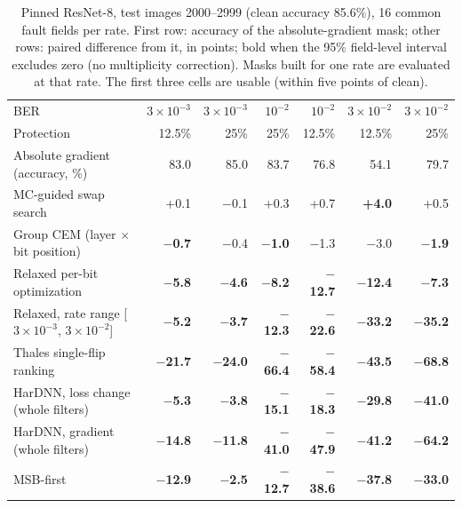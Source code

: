 \begin{table}[h]
\caption{Pinned ResNet-8, test images 2000--2999 (clean accuracy 85.6\%), 16 common fault fields per rate. First row: accuracy of the absolute-gradient mask; other rows: paired difference from it, in points; bold when the 95\% field-level interval excludes zero (no multiplicity correction). Masks built for one rate are evaluated at that rate. The first three cells are usable (within five points of clean).}\label{tab:search}
\centering\footnotesize\setlength{\tabcolsep}{4pt}
\begin{tabular}{l r r r r r r}\toprule
BER & $3\!\times\!10^{-3}$ & $3\!\times\!10^{-3}$ & $10^{-2}$ & $10^{-2}$ & $3\!\times\!10^{-2}$ & $3\!\times\!10^{-2}$\\
Protection & 12.5\% & 25\% & 25\% & 12.5\% & 12.5\% & 25\%\\\midrule
Absolute gradient (accuracy, \%) & 83.0 & 85.0 & 83.7 & 76.8 & 54.1 & 79.7\\
MC-guided swap search & +0.1 & $-$0.1 & +0.3 & +0.7 & \textbf{+4.0} & +0.5\\
Group CEM (layer $\times$ bit position) & \textbf{$-$0.7} & $-$0.4 & \textbf{$-$1.0} & $-$1.3 & $-$3.0 & \textbf{$-$1.9}\\
Relaxed per-bit optimization & \textbf{$-$5.8} & \textbf{$-$4.6} & \textbf{$-$8.2} & \textbf{$-$12.7} & \textbf{$-$12.4} & \textbf{$-$7.3}\\
Relaxed, rate range [$3\!\times\!10^{-3}$, $3\!\times\!10^{-2}$] & \textbf{$-$5.2} & \textbf{$-$3.7} & \textbf{$-$12.3} & \textbf{$-$22.6} & \textbf{$-$33.2} & \textbf{$-$35.2}\\
Thales single-flip ranking & \textbf{$-$21.7} & \textbf{$-$24.0} & \textbf{$-$66.4} & \textbf{$-$58.4} & \textbf{$-$43.5} & \textbf{$-$68.8}\\
HarDNN, loss change (whole filters) & \textbf{$-$5.3} & \textbf{$-$3.8} & \textbf{$-$15.1} & \textbf{$-$18.3} & \textbf{$-$29.8} & \textbf{$-$41.0}\\
HarDNN, gradient (whole filters) & \textbf{$-$14.8} & \textbf{$-$11.8} & \textbf{$-$41.0} & \textbf{$-$47.9} & \textbf{$-$41.2} & \textbf{$-$64.2}\\
MSB-first & \textbf{$-$12.9} & \textbf{$-$2.5} & \textbf{$-$12.7} & \textbf{$-$38.6} & \textbf{$-$37.8} & \textbf{$-$33.0}\\\bottomrule
\end{tabular}
\end{table}


